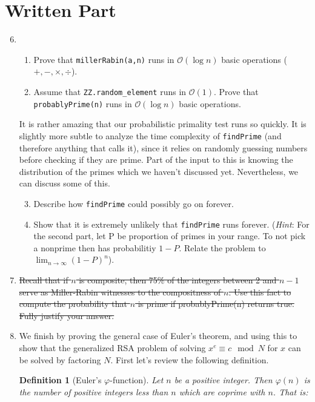 \documentclass[11pt]{article}
\newtheorem{definition}{Definition}
\newcommand{\cO}{\mathcal{O}}
\begin{document}
\section*{Written Part}
\begin{enumerate}
  \setcounter{enumi}{5}
  \item{
  \begin{enumerate}
    \item{
    Prove that \verb|millerRabin(a,n)| runs in $\cO(\log n)$ basic operations ($+,-,\times,\div$).
    }
    \item{
    Assume that \verb|ZZ.random_element| runs in $\cO(1)$.  Prove that \verb|probablyPrime(n)| runs in $\cO(\log n)$ basic operations.
    }
  \end{enumerate}
  It is rather amazing that our probabilistic primality test runs so quickly.  It is slightly more subtle to analyze the time complexity of \verb|findPrime| (and therefore anything that calls it), since it relies on randomly guessing numbers before checking if they are prime.  Part of the input to this is knowing the distribution of the primes which we haven't discussed yet.  Nevertheless, we can discuss some of this.
  \begin{enumerate}
    \setcounter{enumii}{2}
    \item{
    Describe how \verb|findPrime| could possibly go on forever.
    }
    \item{
    Show that it is extremely unlikely that \verb|findPrime| runs forever.  (\textit{Hint}: For the second part, let P be proportion of primes in your range.  To not pick a nonprime then has probabilitiy $1-P$.  Relate the problem to $\lim_{n\to\infty}(1-P)^n$).
    }
  \end{enumerate}
  }
  \item{
  \sout{Recall that if $n$ is composite, then 75\% of the integers between 2 and $n-1$ serve as Miller-Rabin witnesses to the compositness of $n$.  Use this fact to compute the probability that $n$ is prime if probablyPrime(n) returns true.  Fully justify your answer.}
  }
  \item{
  We finish by proving the general case of Euler's theorem, and using this to show that the generalized RSA problem of solving $x^e\equiv c\mod N$ for $x$ can be solved by factoring $N$.  First let's review the following definition.
  \begin{definition}[Euler's $\varphi$-function]
    Let $n$ be a positive integer.  Then $\varphi(n)$ is the number of positive integers less than $n$ which are coprime with $n$.  That is:

\end{definition}}
\end{enumerate}
\end{document}
